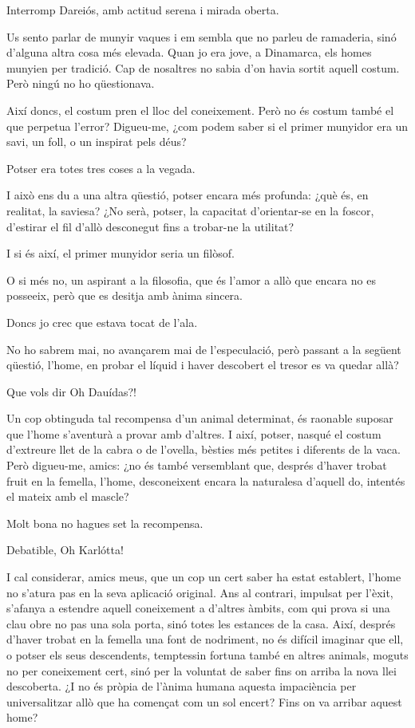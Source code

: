 Interromp Dareiós, amb actitud serena i mirada oberta.
\begin{platdialogue}
\item[\speaker{Dareiós:}] Us sento parlar de munyir vaques i em sembla que no parleu de ramaderia, sinó d’alguna altra cosa més elevada. Quan jo era jove, a Dinamarca, els homes munyien per tradició. Cap de nosaltres no sabia d’on havia sortit aquell costum. Però ningú no ho qüestionava.
\item[\speaker{Dauídas:}] Així doncs, el costum pren el lloc del coneixement. Però no és costum també el que perpetua l’error? Digueu-me, ¿com podem saber si el primer munyidor era un savi, un foll, o un inspirat pels déus?
\item[\speaker{Rógos:}] Potser era totes tres coses a la vegada.
\item[\speaker{Dauídas:}] I això ens du a una altra qüestió, potser encara més profunda: ¿què és, en realitat, la saviesa? ¿No serà, potser, la capacitat d’orientar-se en la foscor, d’estirar el fil d’allò desconegut fins a trobar-ne la utilitat?
\item[\speaker{Rógos:}] I si és així, el primer munyidor seria un filòsof.
\item[\speaker{Dauídas:}] O si més no, un aspirant a la filosofia, que és l’amor a allò que encara no es posseeix, però que es desitja amb ànima sincera.
\item[\speaker{Dareiós:}] Doncs jo crec que estava tocat de l'ala.
\item[\speaker{Dauídas:}] No ho sabrem mai, no avançarem mai de l'especulació, però passant a la següent qüestió, l'home, en probar el líquid i haver descobert el tresor es va quedar allà?
\item[\speaker{Rógos:}] Que vols dir Oh Dauídas?!
\item[\speaker{Dauídas:}] Un cop obtinguda tal recompensa d’un animal determinat, és raonable suposar que l’home s’aventurà a provar amb d’altres. I així, potser, nasqué el costum d’extreure llet de la cabra o de l’ovella, bèsties més petites i diferents de la vaca. Però digueu-me, amics: ¿no és també versemblant que, després d’haver trobat fruit en la femella, l’home, desconeixent encara la naturalesa d’aquell do, intentés el mateix amb el mascle?
\item[\speaker{Karlótta:}] Molt bona no hagues set la recompensa.
\item[\speaker{Rógos:}] Debatible, Oh Karlótta!
\item[\speaker{Dauídas:}] I cal considerar, amics meus, que un cop un cert saber ha estat establert, l’home no s’atura pas en la seva aplicació original. Ans al contrari, impulsat per l’èxit, s’afanya a estendre aquell coneixement a d’altres àmbits, com qui prova si una clau obre no pas una sola porta, sinó totes les estances de la casa. Així, després d’haver trobat en la femella una font de nodriment, no és difícil imaginar que ell, o potser els seus descendents, temptessin fortuna també en altres animals, moguts no per coneixement cert, sinó per la voluntat de saber fins on arriba la nova llei descoberta. ¿I no és pròpia de l’ànima humana aquesta impaciència per universalitzar allò que ha començat com un sol encert? Fins on va arribar aquest home?

\end{platdialogue}
